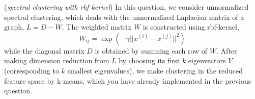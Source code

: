\documentclass[a4paper, 12pt]{exam}
\begin{document}
\begin{questions}
		\question (\emph{spectral clustering with rbf kernel})
		In this question, we consider unnormalized spectral clustering, which deals with the unnormalized Laplacian matrix of a graph, $L= D - W$. 
		The weighted matrix $W$ is constructed using rbf-kernel,
		\begin{equation}\label{eq:W}
		    W_{ij} = \exp(- \gamma || x^{(i)} - x^{(j)} ||^2)
		\end{equation}
		while the diagonal matrix $D$ is obtained by summing each row of $W$.
		After making dimension reduction from $L$ by choosing its first $k$ eigenvectors $V$
		(corresponding to $k$ smallest eigenvalues), we make clustering
		in the reduced feature space by k-means, which you have already implemented in the previous question.
\end{questions}
\end{document}
